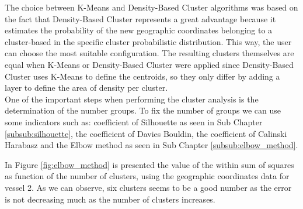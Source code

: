 The choice between K-Means and Density-Based Cluster algorithms was based on the fact that Density-Based Cluster represents a great advantage because it estimates the probability of the new geographic coordinates belonging to a cluster-based in the specific cluster probabilistic distribution. This way, the user can choose the most suitable configuration. The resulting clusters themselves are equal when K-Means or Density-Based Cluster were applied since Density-Based Cluster uses K-Means to define the centroids, so they only differ by adding a layer to define the area of density per cluster.
\\


%
%		    	     
%
%
%


One of the important steps when performing the cluster analysis is the determination of the number groups. To fix the number of groups we can use some indicators such as: coefficient of Silhouette as seen in Sub Chapter \ref{subsub:silhouette}, the coefficient of Davies Bouldin, the coefficient of Calinski Harabasz and the Elbow method as seen in Sub Chapter \ref{subsub:elbow_method}. 


In Figure \ref{fig:elbow_method} is presented the value of the within sum of squares as function of the number of clusters, using the geographic coordinates data for vessel 2. As we can observe, six clusters seems to be a good number as the error is not decreasing much as the number of clusters increases. 


